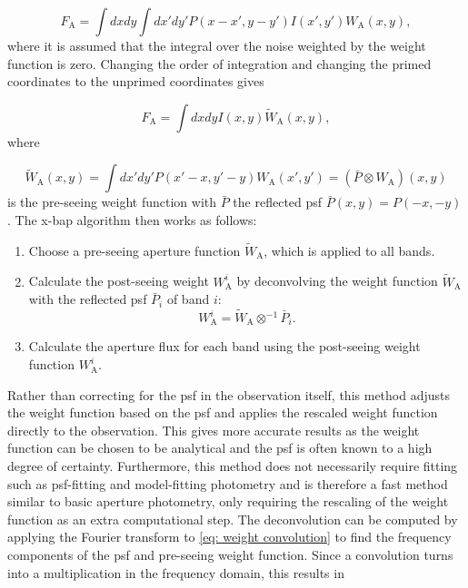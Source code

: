 \begin{equation}
    F_\mathrm{A} = \int dxdy\int dx'dy'P(x-x', y-y')I(x',y')W_\mathrm{A}(x,y),
\end{equation}
where it is assumed that the integral over the noise weighted by the weight function is zero.
Changing the order of integration and changing the primed coordinates to the unprimed coordinates gives

\begin{equation}
    F_\mathrm{A} = \int dxdyI(x,y)\tilde{W}_\mathrm{A}(x,y),
\end{equation}
where 

\begin{equation}\label{eq: weight convolution}
    \tilde{W}_\mathrm{A}(x,y) = \int dx'dy'P(x'-x, y'-y)W_\mathrm{A}(x',y')=(\bar{P}\otimes W_\mathrm{A})(x,y)
\end{equation}
is the pre-seeing weight function with $\bar{P}$ the reflected \gls{psf} $\bar{P}(x,y)=P(-x,-y)$.
\newline
\newline
The \gls{x-bap} algorithm then works as follows:
\begin{tcolorbox}[colback=white,colframe=black,title=X-BAP procedure]
\begin{enumerate}
    \item Choose a pre-seeing aperture function $\tilde{W}_\mathrm{A}$, which is applied to all bands.
    
    \item Calculate the post-seeing weight $W_\mathrm{A}^i$ by deconvolving the weight function $\tilde{W}_\mathrm{A}$ with the reflected \gls{psf} $\bar{P}_i$ of band $i$:
    \[
    W_\mathrm{A}^i
    =
    \tilde{W}_\mathrm{A}
    \otimes^{-1}
    \bar{P}_i.
    \]
    
    \item Calculate the aperture flux for each band using the post-seeing weight function $W_\mathrm{A}^i$.
\end{enumerate}
\end{tcolorbox}
\noindent Rather than correcting for the \gls{psf} in the observation itself, this method adjusts the weight function based on the \gls{psf} and applies the rescaled weight function directly to the observation. This gives more accurate results as the weight function can be chosen to be analytical and the \gls{psf} is often known to a high degree of certainty. Furthermore, this method does not necessarily require fitting such as \gls{psf}-fitting and model-fitting photometry and is therefore a fast method similar to basic aperture photometry, only requiring the rescaling of the weight function as an extra computational step.
\newpage
\noindent The deconvolution can be computed by applying the Fourier transform to \autoref{eq: weight convolution} to find the frequency components of the \gls{psf} and pre-seeing weight function. Since a convolution turns into a multiplication in the frequency domain, this results in

